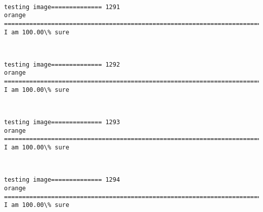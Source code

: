 \documentclass[11pt]{article}
\begin{document}
    \begin{center}
    \end{center}
    { \hspace*{\fill} \\}
    
    \begin{Verbatim}[commandchars=\\\{\}]
testing image============== 1291
orange
============================================================================
I am 100.00\% sure

    \end{Verbatim}

    \begin{center}
    \end{center}
    { \hspace*{\fill} \\}
    
    \begin{Verbatim}[commandchars=\\\{\}]
testing image============== 1292
orange
============================================================================
I am 100.00\% sure

    \end{Verbatim}

    \begin{center}
    \end{center}
    { \hspace*{\fill} \\}
    
    \begin{Verbatim}[commandchars=\\\{\}]
testing image============== 1293
orange
============================================================================
I am 100.00\% sure

    \end{Verbatim}

    \begin{center}
    \end{center}
    { \hspace*{\fill} \\}
    
    \begin{Verbatim}[commandchars=\\\{\}]
testing image============== 1294
orange
============================================================================
I am 100.00\% sure

    \end{Verbatim}
\end{document}
